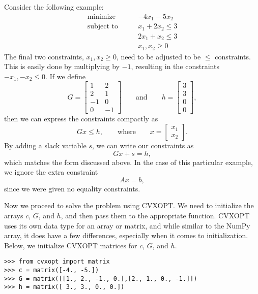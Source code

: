 Consider the following example:
\begin{align*}
\text{minimize}\qquad &-4x_1-5x_2 \\
\text{subject to}\qquad &x_1+2x_2 \leq 3 \\
	        &2x_1+x_2 \leq 3 \\
		&x_1, x_2 \geq 0
\end{align*}
The final two constraints, $x_1, x_2 \geq 0$, need to be adjusted to be $\leq$ constraints.
This is easily done by multiplying by $-1$, resulting in the constraints $-x_1, -x_2 \leq 0$.
If we define
\[
G = \begin{bmatrix}
  1 & 2\\
  2 & 1\\
  -1 & 0\\
  0 & -1
\end{bmatrix} \qquad \text{and} \qquad
h = \begin{bmatrix}
  3\\
  3\\
  0\\
  0
\end{bmatrix},
\]
then we can express the constraints compactly as
\[
Gx \leq h,  \qquad \text{where} \qquad
x = \begin{bmatrix}
  x_1\\
  x_2
\end{bmatrix}.
\]
By adding a slack variable $s$, we can write our constraints as
\[
Gx + s = h,
\]
which matches the form discussed above. In the case of this particular example, we ignore the extra constraint
\[
Ax = b,
\]
since we were given no equality constraints.

Now we proceed to solve the problem using CVXOPT.
We need to initialize the arrays $c$, $G$, and $h$, and then pass them to the appropriate function.
CVXOPT uses its own data type for an array or matrix, and while similar to the NumPy array, it
does have a few differences, especially when it comes to initialization.
Below, we initialize CVXOPT matrices for $c$, $G$, and $h$.

\begin{lstlisting}
>>> from cvxopt import matrix
>>> c = matrix([-4., -5.])
>>> G = matrix([[1., 2., -1., 0.],[2., 1., 0., -1.]])
>>> h = matrix([ 3., 3., 0., 0.])
\end{lstlisting}

